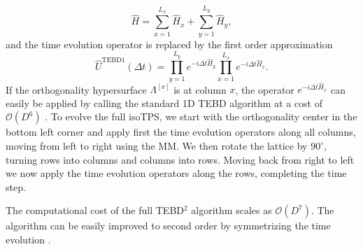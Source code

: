 \begin{equation}
	\hat{H} = \sum_{x = 1}^{L_x} \hat{H}_x + \sum_{y = 1}^{L_y} \hat{H}_y,
\end{equation}
and the time evolution operator is replaced by the first order approximation
\begin{equation}
	\hat{U}^\text{TEBD1}(\Delta t) = \prod_{y=1}^{L_y} e^{-i\Delta t\hat{H}_y} \prod_{x=1}^{L_x} e^{-i\Delta t\hat{H}_x} .
\end{equation}
If the orthogonality hypersurface $\Lambda^{[x]}$ is at column $x$, the operator $e^{-i\Delta t\hat{H}_x}$ can easily be applied by calling the standard 1D TEBD algorithm at a cost of $\mathcal{O}(D^6)$ \cite{cite:isometric_tensor_network_states_in_two_dimensions}. To evolve the full isoTPS, we start with the orthogonality center in the bottom left corner and apply first the time evolution operators along all columns, moving from left to right using the MM. We then rotate the lattice by $90^\circ$, turning rows into columns and columns into rows. Moving back from right to left we now apply the time evolution operators along the rows, completing the time step. \par
The computational cost of the full TEBD$^2$ algorithm scales as $\mathcal{O}(D^7)$. The algorithm can be easily improved to second order by symmetrizing the time evolution \cite{cite:efficient_simulation_of_dynamics_in_two_dimensional_quantum_spin_systems}.